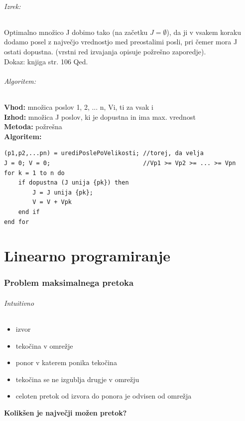 \documentclass[a4paper,10pt]{article}
\begin{document}
\paragraph{Izrek:}
Optimalno mno\v zico J dobimo tako (na za\v cetku $J = \emptyset$), da ji v vsakem koraku dodamo posel z najve\v cjo vrednostjo med preostalimi posli, pri \v cemer mora J ostati dopustna.
(vrstni red izvajanja opisuje po\v zre\v sno zaporedje).\\
Dokaz: knjiga str. 106 Qed.

\paragraph{Algoritem:}
\begin{flushleft}
\textbf{Vhod:} mno\v zica poslov {1, 2, ... n}, Vi, ti za vsak i\\
\textbf{Izhod:} mno\v zica J poslov, ki je dopustna in ima max. vrednost\\
\textbf{Metoda:} po\v zre\v sna\\
\textbf{Algoritem:}
\end{flushleft}
\begin{lstlisting}
(p1,p2,...pn) = urediPoslePoVelikosti; //torej, da velja
J = 0; V = 0;                          //Vp1 >= Vp2 >= ... >= Vpn
for k = 1 to n do 
    if dopustna (J unija {pk}) then
        J = J unija {pk};
        V = V + Vpk
    end if
end for
\end{lstlisting}

\part{Linearno programiranje}

\section{Problem maksimalnega pretoka}

\paragraph{Intuitivno}
\begin{itemize}
\item izvor
\item teko\v cina v omre\v zje
\item ponor v katerem ponika teko\v cina
\item teko\v cina se ne izgublja drugje v omre\v zju
\item celoten pretok od izvora do ponora je odvisen od omre\v zja
\end{itemize}
\textbf{Kolik\v sen je najve\v cji mo\v zen pretok?}
\end{document}
